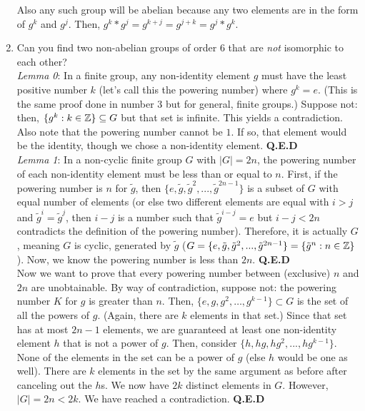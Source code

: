 \documentclass{amsart}
\begin{document}
\begin{enumerate}[itemsep=0.4in]
Also any such group will be abelian because any two elements are in the form of $g^k$ and $g^j$. Then, $g^k*g^j=g^{k+j}=g^{j+k}=g^j*g^k$. 

\item Can you find two non-abelian groups of order $6$ that are \emph{not} isomorphic to each other?\\

\emph{Lemma 0}: In a finite group, any non-identity element $g$ must have the least positive number $k$ (let's call this the powering number) where $g^k=e$. (This is the same proof done in number 3 but for general, finite groups.) Suppose not: then, $\{g^k:k\in\mathbb{Z}\}\subseteq G$ but that set is infinite. This yields a contradiction. Also note that the powering number cannot be $1$. If so, that element would be the identity, though we chose a non-identity element. \textbf{Q.E.D}\\

\emph{Lemma 1}: In a non-cyclic finite group $G$ with $|G|=2n$, the powering number of each non-identity element must be less than or equal to $n$. First, if the powering number is $n$ for $\tilde g$, then $\{e,\tilde g,\tilde g^2,...,\tilde g^{2n-1}\}$ is a subset of $G$ with equal number of elements (or else two different elements are equal with $i>j$ and $\tilde g^i=\tilde g^j$, then $i-j$ is a number such that $\tilde g^{i-j}=e$ but $i-j<2n$ contradicts the definition of the powering number). Therefore, it is actually $G$, meaning $G$ is cyclic, generated by $\tilde g$ ($G=\{e,\tilde g,\tilde g^2,...,\tilde g^{2n-1}\}=\{\tilde g^n:n\in\mathbb{Z}\}$). Now, we know the powering number is less than $2n$. \textbf{Q.E.D}\\

Now we want to prove that every powering number between (exclusive) $n$ and $2n$ are unobtainable.
By way of contradiction, suppose not: the powering number $K$ for $g$ is greater than $n$. Then, $\{e,g,g^2,\dots,g^{k-1}\}\subset G$ is the set of all the powers of $g$. (Again, there are $k$ elements in that set.) Since that set has at most $2n-1$ elements, we are guaranteed at least one non-identity element $h$ that is not a power of $g$. Then, consider $\{h,hg,hg^2,...,hg^{k-1}\}$. None of the elements in the set can be a power of $g$ (else $h$ would be one as well). There are $k$ elements in the set by the same argument as before after canceling out the $h$s. We now have $2k$ distinct elements in $G$. However, $|G|=2n<2k$. We have reached a contradiction. \textbf{Q.E.D}\\


\end{enumerate}
\end{document}
